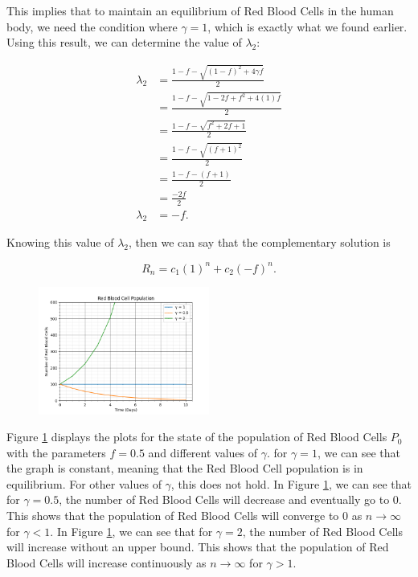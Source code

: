 This implies that to maintain an equilibrium of Red Blood Cells in the human body, we need the condition where $\gamma = 1$, which is exactly what we found earlier. Using this result, we can determine the value of $\lambda_2$:

\begin{align*}
    \lambda_2 &= \frac{1-f - \sqrt{(1-f)^2 + 4\gamma f}}{2}\\
    &= \frac{1-f - \sqrt{1-2f+f^2 + 4(1)f}}{2}\\
    &= \frac{1-f - \sqrt{f^2+2f+1}}{2}\\
    &= \frac{1-f - \sqrt{(f+1)^2}}{2}\\
    &= \frac{1-f - (f+1)}{2}\\
    &= \frac{-2f}{2}\\
    \lambda_2 &= -f.
\end{align*}

Knowing this value of $\lambda_2$, then we can say that the complementary solution is

\begin{equation} \label{eq:7}
    R_n = c_1(1)^n + c_2(-f)^n.
\end{equation}

\begin{figure}[H] 
    \centering
    \includegraphics[width=0.5\textwidth]{images/linear_difference.png}
    \caption{}
    \label{fig:1}
\end{figure}

Figure \ref{fig:1} displays the plots for the state of the population of Red Blood Cells $P_0$ with the parameters $f=0.5$ and different values of $\gamma$. for $\gamma=1$, we can see that the graph is constant, meaning that the Red Blood Cell population is in equilibrium. For other values of $\gamma$, this does not hold. In Figure \ref{fig:1}, we can see that for $\gamma = 0.5$, the number of Red Blood Cells will decrease and eventually go to 0. This shows that the population of Red Blood Cells will converge to 0 as $n\to\infty$ for $\gamma < 1$. In Figure \ref{fig:1}, we can see that for $\gamma = 2$, the number of Red Blood Cells will increase without an upper bound. This shows that the population of Red Blood Cells will increase continuously as $n\to\infty$ for $\gamma > 1$. 


